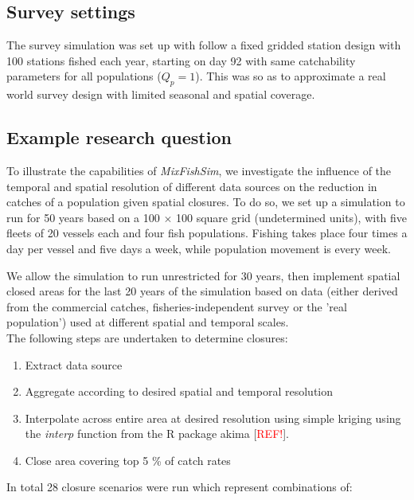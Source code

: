 \documentclass[review]{elsarticle}
\begin{document}
\subsection{Survey settings}

The survey simulation was set up with follow a fixed gridded station design
with 100 stations fished each year, starting on day 92  with same catchability parameters for
all populations ($Q_{p} = 1$). This was so as to approximate a real world
survey design with limited seasonal and spatial coverage. 

\subsection{Example research question}

To illustrate the capabilities of \emph{MixFishSim}, we investigate the
influence of the temporal and spatial resolution of different data sources on
the reduction in catches of a population given spatial closures. To do so, we
set up a simulation to run for 50 years based on a 100 $\times$ 100 square grid
(undetermined units), with five fleets of 20 vessels each and four fish
populations. Fishing takes place four times a day per vessel and five days a
week, while population movement is every week.

We allow the simulation to run unrestricted for 30 years,
then implement spatial closed areas for the last 20 years of the simulation
based on data (either derived from the commercial catches,
fisheries-independent survey or the 'real population') used at different
spatial and temporal scales. \\

The following steps are undertaken to determine closures:
\begin{enumerate}
	\item Extract data source
	\item Aggregate according to desired spatial and temporal resolution
	\item Interpolate across entire area at desired resolution using simple
		kriging using the \emph{interp} function from the R package
		akima [\textcolor{red}{REF!}].
	\item Close area covering top 5 \% of catch rates 
\end{enumerate}
In total 28 closure scenarios were run which represent combinations of:
\end{document}
